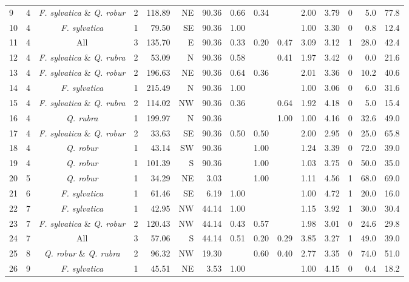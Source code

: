 \documentclass[b5paper,10pt]{book} %
\begin{document}
\begin{sidewaystable}
\begin{center}
\begin{footnotesize}
\begin{tabular}{l l c r r r r r r r r r r r r}
9 & 4 & \textit{F. sylvatica} \& \textit{Q. robur} & 2 & 118.89 & NE & 90.36 & 0.66 & 0.34 &  & 2.00 & 3.79 & 0 & 5.0 & 77.8 \\
10 & 4 & \textit{F. sylvatica} & 1 & 79.50 & SE & 90.36 & 1.00 &  &  & 1.00 & 3.30 & 0 & 0.8 & 12.4 \\
11 & 4 & All & 3 & 135.70 & E & 90.36 & 0.33 & 0.20 & 0.47 & 3.09 & 3.12 & 1 & 28.0 & 42.4 \\
12 & 4 & \textit{F. sylvatica} \& \textit{Q. rubra} & 2 & 53.09 & N & 90.36 & 0.58 &  & 0.41 & 1.97 & 3.42 & 0 & 0.0 & 21.6 \\
13 & 4 & \textit{F. sylvatica} \& \textit{Q. robur} & 2 & 196.63 & NE & 90.36 & 0.64 & 0.36 &  & 2.01 & 3.36 & 0 & 10.2 & 40.6 \\
14 & 4 & \textit{F. sylvatica} & 1 & 215.49 & N & 90.36 & 1.00 &  &  & 1.00 & 3.06 & 0 & 6.0 & 31.6 \\
15 & 4 & \textit{F. sylvatica} \& \textit{Q. rubra} & 2 & 114.02 & NW & 90.36 & 0.36 &  & 0.64 & 1.92 & 4.18 & 0 & 5.0 & 15.4 \\
16 & 4 & \textit{Q. rubra} & 1 & 199.97 & N & 90.36 &  &  & 1.00 & 1.00 & 4.16 & 0 & 32.6 & 49.0 \\
17 & 4 & \textit{F. sylvatica} \& \textit{Q. robur} & 2 & 33.63 & SE & 90.36 & 0.50 & 0.50 &  & 2.00 & 2.95 & 0 & 25.0 & 65.8 \\
18 & 4 & \textit{Q. robur} & 1 & 43.14 & SW & 90.36 &  & 1.00 &  & 1.24 & 3.39 & 0 & 72.0 & 39.0 \\
19 & 4 & \textit{Q. robur} & 1 & 101.39 & S & 90.36 &  & 1.00 &  & 1.03 & 3.75 & 0 & 50.0 & 35.0 \\
20 & 5 & \textit{Q. robur} & 1 & 34.29 & NE & 3.03 &  & 1.00 &  & 1.11 & 4.56 & 1 & 68.0 & 69.0 \\
21 & 6 & \textit{F. sylvatica} & 1 & 61.46 & SE & 6.19 & 1.00 &  &  & 1.00 & 4.72 & 1 & 20.0 & 16.0 \\
22 & 7 & \textit{F. sylvatica} & 1 & 42.95 & NW & 44.14 & 1.00 &  &  & 1.15 & 3.92 & 1 & 30.0 & 30.4 \\
23 & 7 & \textit{F. sylvatica} \& \textit{Q. robur} & 2 & 120.43 & NW & 44.14 & 0.43 & 0.57 &  & 1.98 & 3.01 & 0 & 24.6 & 29.8 \\
24 & 7 & All & 3 & 57.06 & S & 44.14 & 0.51 & 0.20 & 0.29 & 3.85 & 3.27 & 1 & 49.0 & 39.0 \\
25 & 8 & \textit{Q. robur} \& \textit{Q. rubra} & 2 & 96.32 & NW & 19.30 &  & 0.60 & 0.40 & 2.77 & 3.35 & 0 & 74.0 & 51.0 \\
26 & 9 & \textit{F. sylvatica} & 1 & 45.51 & NE & 3.53 & 1.00 &  &  & 1.00 & 4.15 & 0 & 0.4 & 18.2 \\
\bottomrule
\end{tabular}
	\end{footnotesize}
	  \end{center}
	\end{sidewaystable}
\end{document}
